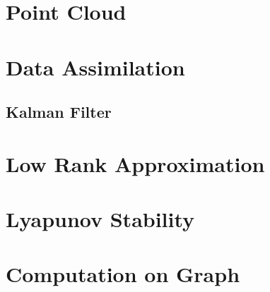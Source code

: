 \section{Point Cloud}


\section{Data Assimilation}
\subsection{Kalman Filter}
\section{Low Rank Approximation}

\section{Lyapunov Stability}

\section{Computation on Graph}

